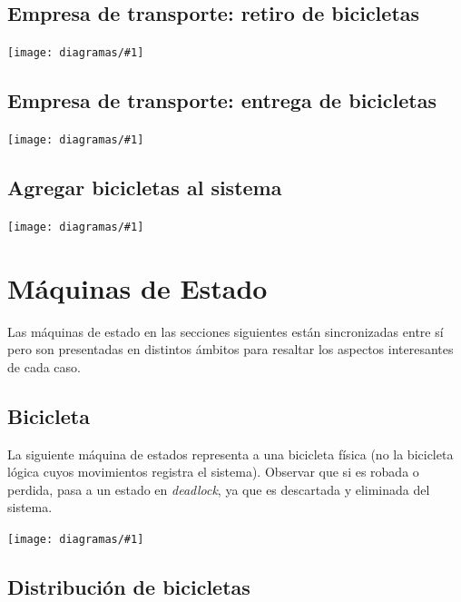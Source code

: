 \documentclass[a4paper, 10pt, twoside]{article}
\newcommand{\diagramav}[1]{%
  \texttt{[image: diagramas/\#1]}%
}
\begin{document}
\subsection{Empresa de transporte: retiro de bicicletas}
\label{sec:da-transporte-retiro}

\diagramav{da-transporte-retiro}


\subsection{Empresa de transporte: entrega de bicicletas}
\label{sec:da-transporte-entrega}

\diagramav{da-transporte-entrega}


\subsection{Agregar bicicletas al sistema}
\label{sec:da-agregar-bicicletas}

\diagramav{da-agregar-bicicletas}




\section{Máquinas de Estado}
Las máquinas de estado en las secciones siguientes están sincronizadas entre sí pero son presentadas en distintos ámbitos para resaltar los aspectos interesantes de cada caso.

\subsection{Bicicleta}

La siguiente máquina de estados representa a una bicicleta física (no la bicicleta lógica cuyos movimientos registra el sistema).
Observar que si es robada o perdida, pasa a un estado en \emph{deadlock}, ya que es descartada y eliminada del sistema.

\diagramav{fsm-bicicleta}

\subsection{Distribución de bicicletas}
\end{document}
